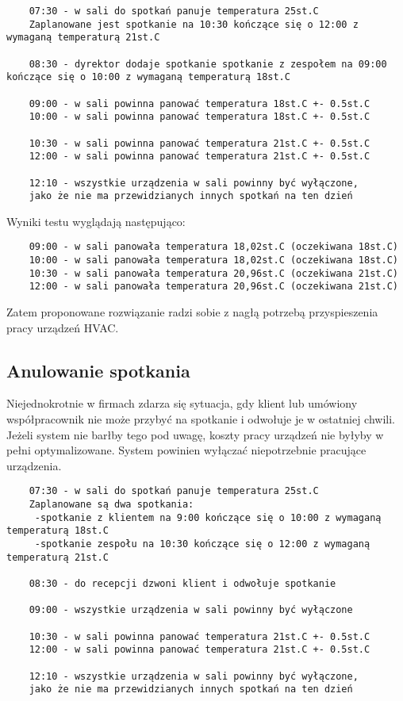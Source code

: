 \begin{lstlisting}
    07:30 - w sali do spotkań panuje temperatura 25st.C
    Zaplanowane jest spotkanie na 10:30 kończące się o 12:00 z wymaganą temperaturą 21st.C
    
    08:30 - dyrektor dodaje spotkanie spotkanie z zespołem na 09:00 kończące się o 10:00 z wymaganą temperaturą 18st.C

    09:00 - w sali powinna panować temperatura 18st.C +- 0.5st.C
    10:00 - w sali powinna panować temperatura 18st.C +- 0.5st.C

    10:30 - w sali powinna panować temperatura 21st.C +- 0.5st.C
    12:00 - w sali powinna panować temperatura 21st.C +- 0.5st.C

    12:10 - wszystkie urządzenia w sali powinny być wyłączone, 
    jako że nie ma przewidzianych innych spotkań na ten dzień
\end{lstlisting}

Wyniki testu wyglądają następująco:
\begin{lstlisting}
    09:00 - w sali panowała temperatura 18,02st.C (oczekiwana 18st.C)
    10:00 - w sali panowała temperatura 18,02st.C (oczekiwana 18st.C)
    10:30 - w sali panowała temperatura 20,96st.C (oczekiwana 21st.C)
    12:00 - w sali panowała temperatura 20,96st.C (oczekiwana 21st.C)
\end{lstlisting}
Zatem proponowane rozwiązanie radzi sobie z nagłą potrzebą przyspieszenia pracy urządzeń HVAC.

\subsection{Anulowanie spotkania}
Niejednokrotnie w firmach zdarza się sytuacja, gdy klient lub umówiony współpracownik nie może przybyć na spotkanie i odwołuje je w ostatniej chwili.
Jeżeli system nie barłby tego pod uwagę, koszty pracy urządzeń nie byłyby w pełni optymalizowane. System powinien wyłączać niepotrzebnie pracujące urządzenia.

\begin{lstlisting}
    07:30 - w sali do spotkań panuje temperatura 25st.C
    Zaplanowane są dwa spotkania:
     -spotkanie z klientem na 9:00 kończące się o 10:00 z wymaganą temperaturą 18st.C    
     -spotkanie zespołu na 10:30 kończące się o 12:00 z wymaganą temperaturą 21st.C
    
    08:30 - do recepcji dzwoni klient i odwołuje spotkanie
    
    09:00 - wszystkie urządzenia w sali powinny być wyłączone

    10:30 - w sali powinna panować temperatura 21st.C +- 0.5st.C
    12:00 - w sali powinna panować temperatura 21st.C +- 0.5st.C

    12:10 - wszystkie urządzenia w sali powinny być wyłączone, 
    jako że nie ma przewidzianych innych spotkań na ten dzień
\end{lstlisting}

